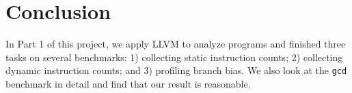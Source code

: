 \documentclass{acm_proc_article-sp}
\begin{document}
\section{Conclusion}
In Part 1 of this project, we apply LLVM to analyze programs and finished three tasks on several benchmarks: 1) collecting static instruction counts; 2) collecting dynamic instruction counts; and 3) profiling branch bias. We also look at the {\tt gcd} benchmark in detail and find that our result is reasonable.


%











%
%
%

\balancecolumns
\end{document}
